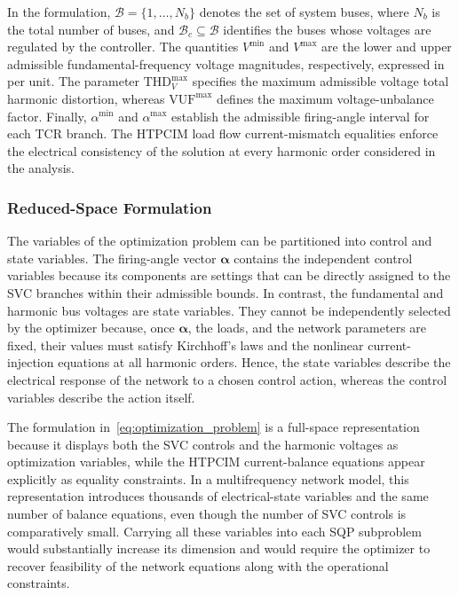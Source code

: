 \documentclass[journal]{IEEEtran}
\begin{document}
In the formulation, $\mathcal{B}=\{1,\ldots,N_b\}$ denotes the set of system buses,
where $N_b$ is the total number of buses, and
$\mathcal{B}_c\subseteq\mathcal{B}$ identifies the buses whose voltages
are regulated by the controller. The quantities $V^{\min}$ and
$V^{\max}$ are the lower and upper admissible fundamental-frequency
voltage magnitudes, respectively, expressed in per unit. The parameter
$\mathrm{THD}_{V}^{\max}$ specifies the maximum admissible voltage total
harmonic distortion, whereas $\mathrm{VUF}^{\max}$ defines the maximum
voltage-unbalance factor. Finally, $\alpha^{\min}$ and
$\alpha^{\max}$ establish the admissible firing-angle interval for
each TCR branch. The HTPCIM  load flow current-mismatch equalities enforce the
electrical consistency of the solution at every harmonic order
considered in the analysis.

\subsubsection{Reduced-Space Formulation}
\label{subsec:reduced_space}

The variables of the optimization problem can be partitioned into control
and state variables. The firing-angle vector $\bm{\alpha}$ contains the
independent control variables because its components are settings that can
be directly assigned to the SVC branches within their admissible bounds. In
contrast, the fundamental and harmonic bus voltages are state variables.
They cannot be independently selected by the optimizer because, once
$\bm{\alpha}$, the loads, and the network parameters are fixed, their values
must satisfy Kirchhoff's laws and the nonlinear current-injection equations
at all harmonic orders. Hence, the state variables describe the electrical
response of the network to a chosen control action, whereas the control
variables describe the action itself.

The formulation in~\eqref{eq:optimization_problem} is a full-space
representation because it displays both the SVC controls and the harmonic
voltages as optimization variables, while the HTPCIM current-balance
equations appear explicitly as equality constraints. In a multifrequency
network model, this representation introduces thousands of electrical-state
variables and the same number of balance equations, even though the number
of SVC controls is comparatively small. Carrying all these variables into
each SQP subproblem would substantially increase its dimension and would
require the optimizer to recover feasibility of the network equations along
with the operational constraints.
\end{document}
